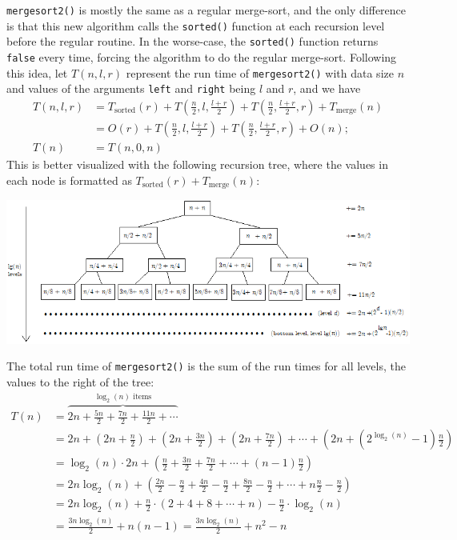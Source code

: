 \documentclass{article}
\begin{document}
\begin{enumerate}
    \texttt{mergesort2()} is mostly the same as a regular merge-sort, and the only difference is that this new algorithm calls the \texttt{sorted()} function at each recursion level before the regular routine. In the worse-case, the \texttt{sorted()} function returns \texttt{false} every time, forcing the algorithm to do the regular merge-sort. Following this idea, let $T(n, l, r)$ represent the run time of \texttt{mergesort2()} with data size $n$ and values of the arguments \texttt{left} and \texttt{right} being $l$ and $r$, and we have
    $$
      \begin{aligned}
        T(n, l, r) & = T_{\text{sorted}}(r) + T(\frac{n}{2}, l, \frac{l+r}{2})
        + T(\frac{n}{2}, \frac{l+r}{2}, r) + T_{\text{merge}}(n)                                          \\
                   & = O(r) + T(\frac{n}{2}, l, \frac{l+r}{2}) + T(\frac{n}{2}, \frac{l+r}{2}, r) + O(n); \\
        T(n)       & = T(n, 0, n)
      \end{aligned}
    $$
    This is better visualized with the following recursion tree, where the values in each node is formatted as $\boxed{T_{\text{sorted}}(r) + T_{\text{merge}}(n)}$:

    \includegraphics[width=\linewidth]{./images/q4_1.png}

    The total run time of \texttt{mergesort2()} is the sum of the run times for all levels, the values to the right of the tree:
    $$
      \begin{aligned}
        T(n) & = \overbrace{2n + \frac{5n}{2} + \frac{7n}{2} + \frac{11n}{2} + \cdots}^{\log_2(n)\text{ items}}      \\
             & = 2n + (2n + \frac{n}{2}) + (2n + \frac{3n}{2}) + (2n + \frac{7n}{2})
        + \cdots + (2n + (2^{\log_2(n)}-1)\frac{n}{2})                                                               \\
             & = \log_2(n) \cdot 2n + (\frac{n}{2} + \frac{3n}{2} + \frac{7n}{2}
        + \cdots + (n - 1)\frac{n}{2})                                                                               \\
             & = 2n\log_2(n) + (\frac{2n}{2} - \frac{n}{2} + \frac{4n}{2} - \frac{n}{2} + \frac{8n}{2} - \frac{n}{2}
        + \cdots+ n\frac{n}{2} - \frac{n}{2})                                                                        \\
             & = 2n\log_2(n) + \frac{n}{2} \cdot (2 + 4 + 8 + \cdots + n) - \frac{n}{2} \cdot \log_2(n)              \\
             & = \frac{3n\log_2(n)}{2} + n(n - 1) = \boxed{\frac{3n\log_2(n)}{2} + n^2 - n}
      \end{aligned}
    $$


\end{enumerate}
\end{document}
